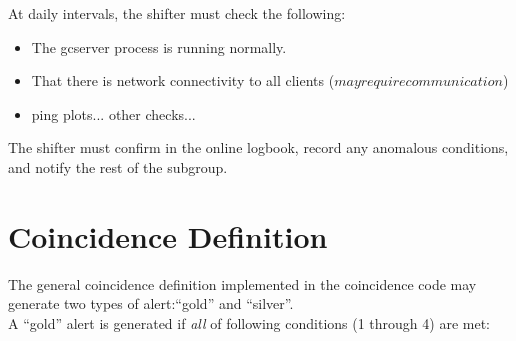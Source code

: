 \documentclass{article}
\begin{document}
At daily intervals, the shifter must check the following:

\begin{itemize}
\item The gcserver process is running normally.
\item That there is network connectivity to all clients ($ may
require communication $)
\item ping plots... other checks...

\end{itemize}

The shifter must confirm in the online logbook, record any
anomalous conditions, and notify the rest of the subgroup.



\section{Coincidence Definition}

The general coincidence definition implemented in the coincidence code
may generate two types of alert:``gold'' and ``silver''.\\
A ``gold'' alert is generated if {\it all} of
following conditions (1 through 4) are met:
\end{document}
